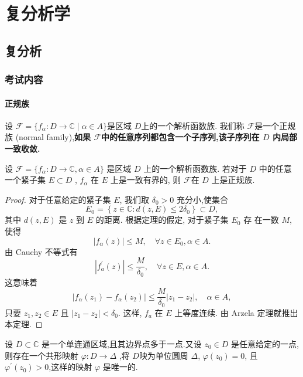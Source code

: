 \part{复分析学}
\chapter{复分析}
\section{考试内容}
\subsection{正规族}
\begin{defi}[正规族]\label{def: normal family}
    设 $\mathscr{F}=\{f_\alpha \colon D\to \mathbb{C}\mid \alpha \in A\}$是区域 $D$上的一个解析函数族. 我们称 $\mathscr{F}$是一个正规族 (normal family),\textbf{如果 $\mathscr{F}$中的任意序列都包含一个子序列,该子序列在 $D$ 内局部一致收敛.}
\end{defi}
\begin{thm}[Montel 定理]\label{thm: Montel thm}
    设 $\mathscr{F}=\{f_\alpha \colon D\to \mathbb
    {C} ,\alpha\in A\}$ 是区域 $D$ 上的一个解析函数族. 若对于 $D$ 中的任意一个紧子集 $E\subset D$ , $f_\alpha$ 在 $E$ 上是一致有界的, 则 $\mathscr{F}$在 $D$ 上是正规族.
\end{thm}
\begin{proof}
    对于任意给定的紧子集 $E$, 我们取 $\delta_0>0$ 充分小,使集合
$$
E_0=\left\{z \in \mathbb{C}: d(z, E) \leqslant 2 \delta_0\right\} \subset D,
$$
其中 $d(z, E)$ 是 $z$ 到 $E$ 的距离. 根据定理的假定, 对于紧子集 $E_0$ 存 在一数 $M$,使得
$$
\left|f_\alpha(z)\right| \leqslant M, \quad \forall z \in E_0, \alpha \in A .
$$
由 Cauchy 不等式有
$$
\left|f_a^{\prime}(z)\right| \leqslant \frac{M}{\delta_0}, \quad \forall z \in E, \alpha \in A .
$$
这意味着
$$
\left|f_\alpha\left(z_1\right)-f_\alpha\left(z_2\right)\right| \leqslant \frac{M}{\delta_0}\left|z_1-z_2\right|, \quad \alpha \in A,
$$
只要 $z_1, z_2 \in E$ 且 $\left|z_1-z_2\right|<\delta_0$. 这样, $f_a$ 在 $E$ 上等度连续. 由 Arzela 定理就推出本定理. 
\end{proof}
\begin{thm}\label{thm: Riemann map theorem}
    设 $D\subset \mathbb
    {C}$ 是一个单连通区域,且其边界点多于一点.又设 $z_0\in D$ 是任意给定的一点,则存在一个共形映射 $\varphi : D\to \Delta$ ,将 $D$映为单位圆周 $\Delta$, $\varphi(z_0)=0$,
    且 $\varphi^\prime (z_0)>0$,这样的映射 $\varphi$ 是唯一的.
\end{thm}
